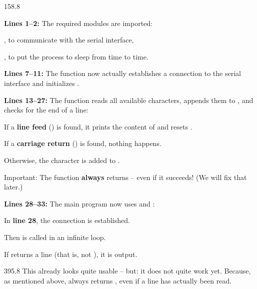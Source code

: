 \documentclass{aslab}
\begin{document}
\begin{region}[pitch=13.8]{158.8}
\begin{dashlist}
\item \textbf{Lines 1--2:} The required modules are imported:
  \begin{dashlist}
  \item {}, to communicate with the serial interface,
  \item {}, to put the process to sleep from time to time.
  \end{dashlist}
\item \textbf{Lines 7--11:} The function  now actually
  establishes a connection to the serial interface and initializes
  .
\item \textbf{Lines 13--27:} The function  reads all
  available characters, appends them to , and checks for the
  end of a line:
  \begin{dashlist}
  \item If a \textbf{line feed} (\code{\n}) is found, it prints the content
    of  and resets .
  \item If a \textbf{carriage return} (\code{\r}) is found, nothing happens.
  \item Otherwise, the character is added to .
  \item Important: The function \textbf{always} returns  -- even
    if it succeeds! (We will fix that later.)
  \end{dashlist}
\item \textbf{Lines 28--33:} The main program now uses  and
  :
  \begin{dashlist}
  \item In \textbf{line 28}, the connection is established.
  \item Then  is called in an infinite loop.
  \item If  returns a line (that is, not ), it is
    output.
  \end{dashlist}
\end{dashlist}
\end{region}

\begin{region}[pitch=13.4]{395.8}
This already looks quite usable -- but: it does not quite work yet. Because,
as mentioned above,  always returns , even if a
line has actually been read.
\end{region}
\end{document}
